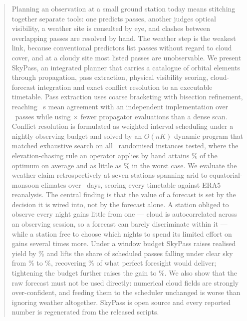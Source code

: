 \documentclass[conference]{IEEEtran}
\begin{document}
\begin{abstract}
Planning an observation at a small ground station today means stitching together
separate tools: one predicts passes, another judges optical visibility, a weather
site is consulted by eye, and clashes between overlapping passes are resolved by
hand. The weather step is the weakest link, because conventional predictors list
passes without regard to cloud cover, and at a cloudy site most listed passes are
unobservable. We present SkyPass, an integrated planner that carries a catalogue
of orbital elements through propagation, pass extraction, physical visibility
scoring, cloud-forecast integration and exact conflict resolution to an
executable timetable. Pass extraction uses coarse bracketing with bisection
refinement, reaching \SkyfieldTca~s mean agreement with an independent
implementation over \NMatched~passes while using \CallReduction$\times$ fewer
propagator evaluations than a dense scan. Conflict resolution is formulated as
weighted interval scheduling under a nightly observing budget and solved by an
$O(nK)$ dynamic program that matched exhaustive search on all
\SchedTrials~randomised instances tested, where the elevation-chasing rule an
operator applies by hand attains \GreedyElevPct\% of the optimum on average and
as little as \GreedyElevMin\% in the worst case. We evaluate the weather claim
retrospectively at seven stations spanning arid to equatorial-monsoon climates
over \EvalDays~days, scoring every timetable against ERA5 reanalysis. The
central finding is that the value of a forecast is set by the decision it is
wired into, not by the forecast alone. A station obliged to observe every night
gains little from one --- cloud is autocorrelated across an observing session, so
a forecast can barely discriminate within it --- while a station free to choose
which nights to spend its limited effort on gains several times more. Under a
window budget SkyPass raises realised yield by \BudgetGainClear\% and lifts the
share of scheduled passes falling under clear sky from \BudgetBlindClearRate\%
to \BudgetClearRate\%, recovering \BudgetRecoveredClear\% of what perfect
foresight would deliver; tightening the budget further raises the gain to
\TightGainClear\%. We
also show that the raw forecast must not be used directly: numerical cloud
fields are strongly over-confident, and feeding them to the scheduler unchanged
is worse than ignoring weather altogether. SkyPass is open source and every
reported number is regenerated from the released scripts.
\end{abstract}
\end{document}

